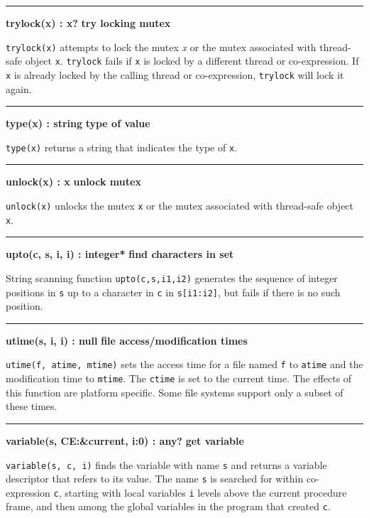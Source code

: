 \bigskip\hrule\vspace{0.1cm}
\noindent
{\bf trylock(x) : x? } \hfill {\bf try locking mutex}

\noindent
{}\texttt{trylock(x)} attempts to lock the mutex {\textit x} or the
mutex associated with thread-safe object \texttt{x}. \texttt{trylock} fails
if \texttt{x} is locked by a different thread or co-expression. If \texttt{x}
is already locked by the calling thread or co-expression, \texttt{trylock}
will lock it again.

\bigskip\hrule\vspace{0.1cm}
\noindent
{\bf type(x) : string } \hfill {\bf type of value}

\noindent
{}\texttt{type(x)} returns a string that indicates the type
of \texttt{x}.

\bigskip\hrule\vspace{0.1cm}
\noindent
{\bf unlock(x) : x } \hfill {\bf unlock mutex}

\noindent
{}\texttt{unlock(x)} unlocks the mutex \texttt{x} or the mutex
associated with thread-safe object \texttt{x}.

\bigskip\hrule\vspace{0.1cm}
\noindent
{\bf upto(c, s, i, i) : integer* } \hfill {\bf find characters in set}

\noindent
String scanning function \texttt{upto(c,s,i1,i2)}
generates the sequence of integer positions in \texttt{s} up to a
character in \texttt{c} in \texttt{s[i1:i2]}, but fails if there is no
such position.

\bigskip\hrule\vspace{0.1cm}
\noindent
{\bf utime(s, i, i) : null } \hfill {\bf file access/modification times}

\noindent
\texttt{utime(f, atime, mtime)} sets the access
time for a file named \texttt{f} to \texttt{atime} and the modification
time to \texttt{mtime}. The \texttt{ctime} is set to the current time.
The effects of this function are platform specific. Some file systems
support only a subset of these times.

\bigskip\hrule\vspace{0.1cm}
\noindent
{\bf variable(s, CE:\&current, i:0) : any? } \hfill {\bf get variable}

\noindent
{}\texttt{variable(s, c, i)} finds the variable
with name \texttt{s} and returns a variable descriptor that refers to
its value. The name \texttt{s} is searched for within co-expression
\texttt{c}, starting with local variables \texttt{i} levels above the
current procedure frame, and then among the global variables in the
program that created \texttt{c}.


